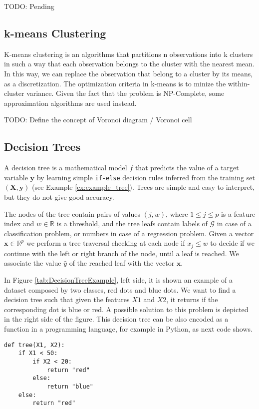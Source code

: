 {\color{red} TODO: Pending}

\subsection{k-means Clustering}
\label{sec:kmeans_clustering}

K-means clustering is an algorithms that partitions n observations into k clusters in such a way that each observation belongs to the cluster with the nearest mean. In this way, we can replace the observation that belong to a cluster by its means, as a discretization. The optimization criteria in k-means is to minize the within-cluster variance. Given the fact that the problem is NP-Complete, some approximation algorithms are used instead.

{\color{red} TODO: Define the concept of Voronoi diagram / Voronoi cell}


\subsection{Decision Trees}
\label{subsec:learning_decision_trees}

A decision tree is a mathematical model $f$ that predicts the value of a target variable $\mathbf{y}$ by learning simple \texttt{if-else} decision rules inferred from the training set $(\mathbf{X}, \mathbf{y})$ (see Example \ref{ex:example_tree}). Trees are simple and easy to interpret, but they do not give good accuracy.


The nodes of the tree contain pairs of values $(j, w)$, where $1 \leq j \leq p$ is a feature index and $w \in \mathbb{R}$ is a threshold, and the tree leafs contain labels of $\mathcal{G}$ in case of a classification problem, or numbers in case of a regression problem. Given a vector $\textbf{x} \in \mathbb{R}^p$ we perform a tree traversal checking at each node if $x_j \leq w$ to decide if we continue with the left or right branch of the node, until a leaf is reached. We associate the value $\hat{y}$ of the reached leaf with the vector $\textbf{x}$.

\begin{example}
    \label{ex:example_tree}
    In Figure \ref{tab:DecisionTreeExample}, left side, it is shown an example of a dataset composed by two classes, red dots and blue dots. We want to find a decision tree such that given the features $X1$ and $X2$, it returns if the corresponding dot is blue or red. A possible solution to this problem is depicted in the right side of the figure. This decision tree can be also encoded as a function in a programming language, for example in Python, as next code shows.

    \begin{sourcecode}
        {\scriptsize \begin{verbatim}
def tree(X1, X2):
    if X1 < 50:
        if X2 < 20:
            return "red"
        else:
            return "blue"
    else:
        return "red"
\end{verbatim}}
    \end{sourcecode}

\end{example}

